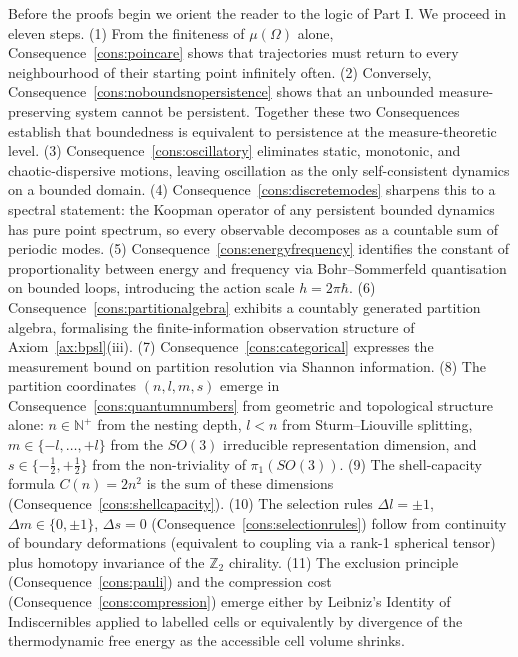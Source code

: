 \documentclass[11pt,twocolumn,a4paper]{article}
\theoremstyle{axiomstyle}
\theoremstyle{conseqstyle}
\theoremstyle{definition}
\theoremstyle{remark}
\newcommand{\Natural}{\mathbb{N}}
\begin{document}
Before the proofs begin we orient the reader to the logic of Part I. We proceed in eleven steps. (1) From the finiteness of $\mu(\Omega)$ alone, Consequence~\ref{cons:poincare} shows that trajectories must return to every neighbourhood of their starting point infinitely often. (2) Conversely, Consequence~\ref{cons:noboundsnopersistence} shows that an unbounded measure-preserving system cannot be persistent. Together these two Consequences establish that boundedness is equivalent to persistence at the measure-theoretic level. (3) Consequence~\ref{cons:oscillatory} eliminates static, monotonic, and chaotic-dispersive motions, leaving oscillation as the only self-consistent dynamics on a bounded domain. (4) Consequence~\ref{cons:discretemodes} sharpens this to a spectral statement: the Koopman operator of any persistent bounded dynamics has pure point spectrum, so every observable decomposes as a countable sum of periodic modes. (5) Consequence~\ref{cons:energyfrequency} identifies the constant of proportionality between energy and frequency via Bohr--Sommerfeld quantisation on bounded loops, introducing the action scale $h=2\pi\hbar$. (6) Consequence~\ref{cons:partitionalgebra} exhibits a countably generated partition algebra, formalising the finite-information observation structure of Axiom~\ref{ax:bpsl}(iii). (7) Consequence~\ref{cons:categorical} expresses the measurement bound on partition resolution via Shannon information. (8) The partition coordinates $(n,l,m,s)$ emerge in Consequence~\ref{cons:quantumnumbers} from geometric and topological structure alone: $n\in\Natural^{+}$ from the nesting depth, $l<n$ from Sturm--Liouville splitting, $m\in\{-l,\ldots,+l\}$ from the $SO(3)$ irreducible representation dimension, and $s\in\{-\tfrac{1}{2},+\tfrac{1}{2}\}$ from the non-triviality of $\pi_{1}(SO(3))$. (9) The shell-capacity formula $C(n)=2n^{2}$ is the sum of these dimensions (Consequence~\ref{cons:shellcapacity}). (10) The selection rules $\Delta l=\pm 1$, $\Delta m\in\{0,\pm 1\}$, $\Delta s=0$ (Consequence~\ref{cons:selectionrules}) follow from continuity of boundary deformations (equivalent to coupling via a rank-1 spherical tensor) plus homotopy invariance of the $\mathbb{Z}_{2}$ chirality. (11) The exclusion principle (Consequence~\ref{cons:pauli}) and the compression cost (Consequence~\ref{cons:compression}) emerge either by Leibniz's Identity of Indiscernibles applied to labelled cells or equivalently by divergence of the thermodynamic free energy as the accessible cell volume shrinks.
\end{document}
